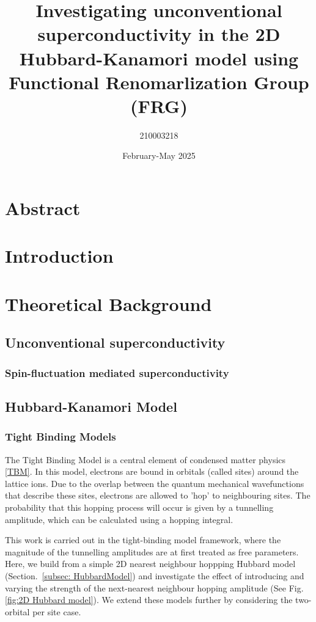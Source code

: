 \documentclass[12pt]{article}
\title{Investigating unconventional superconductivity in the 2D Hubbard-Kanamori model using Functional Renomarlization Group (FRG)}
\author{210003218}
\date{February-May 2025}
\begin{document}
\maketitle
\tableofcontents 


\section{Abstract}

\section{Introduction}

\section{Theoretical Background}

\subsection{Unconventional superconductivity}

\subsubsection{Spin-fluctuation mediated superconductivity}

\subsection{Hubbard-Kanamori Model}

\subsubsection{Tight Binding Models}

The Tight Binding Model is a central element of condensed matter physics \eqref{TBM}. In this model, electrons are bound in orbitals (called sites) around the lattice ions.
Due to the overlap between the quantum mechanical wavefunctions that describe these sites, electrons are allowed to 'hop' to neighbouring sites. The probability that this hopping process will occur is given by a tunnelling amplitude, which can be calculated using a hopping integral. \par
\medskip
\noindent This work is carried out in the tight-binding model framework, where the magnitude of the tunnelling amplitudes are at first treated as free parameters. 
Here, we build from a simple 2D nearest neighbour hoppping Hubbard model (Section.~\ref{subsec: HubbardModel}) and investigate the effect of introducing and varying the strength of the next-nearest neighbour hopping amplitude (See Fig. \ref{fig:2D Hubbard model}).
We extend these models further by considering the two-orbital per site case. 
\end{document}
